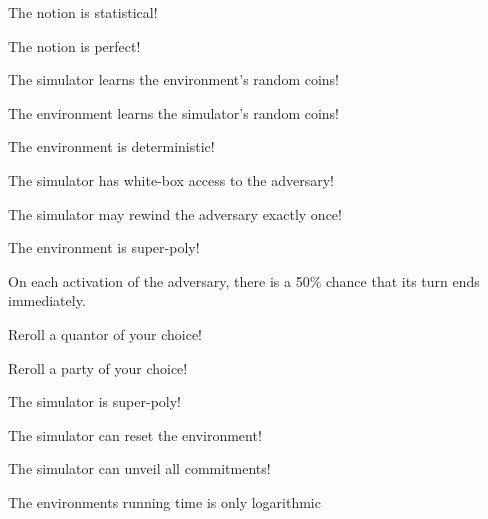 \documentclass[avery5371,frame,grid]{flashcards}
\begin{document}
\begin{flashcard}{\ucftw}
  The notion is statistical!
\end{flashcard}
\begin{flashcard}{\ucftw}
  The notion is perfect!
\end{flashcard}
\begin{flashcard}{\ucftw}
  The simulator learns the environment's random coins!
\end{flashcard}
\begin{flashcard}{\ucftw}
  The environment learns the simulator's random coins!
\end{flashcard}
\begin{flashcard}{\ucftw}
  The environment is deterministic!
\end{flashcard}
\begin{flashcard}{\ucftw}
  The simulator has white-box access to the adversary!
\end{flashcard}
\begin{flashcard}{\ucftw}
  The simulator may rewind the adversary exactly once!
\end{flashcard}
\begin{flashcard}{\ucftw}
  The environment is super-poly!
\end{flashcard}
\begin{flashcard}{\ucftw}
  On each activation of the adversary, there is a 50\% chance that its turn ends immediately. 
\end{flashcard}
\begin{flashcard}{\ucftw}
  Reroll a quantor of your choice!
\end{flashcard}
\begin{flashcard}{\ucftw}
  Reroll a party of your choice!
\end{flashcard}
\begin{flashcard}{\ucftw}
  The simulator is super-poly!
\end{flashcard}
\begin{flashcard}{\ucftw}
  The simulator can reset the environment!
\end{flashcard}
\begin{flashcard}{\ucftw}
  The simulator can unveil all commitments!
\end{flashcard}
\begin{flashcard}{\ucftw}
  The environments running time is only logarithmic
\end{flashcard}

\end{document}
